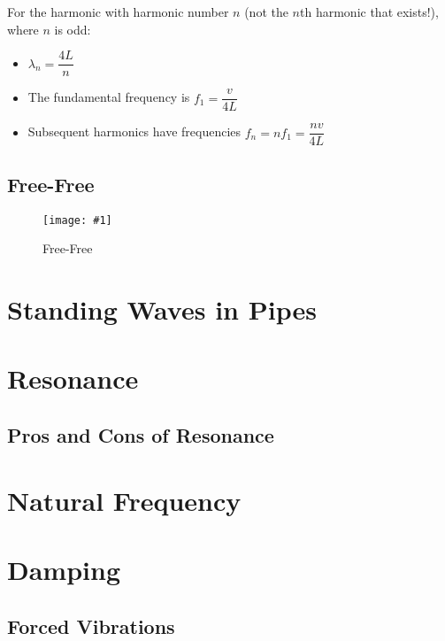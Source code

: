 \documentclass[a4paper,12pt]{article}
\let\oldsection\section
\renewcommand\section{\clearpage\oldsection}
\newcommand{\img}[4]{\begin{center}
  \begin{figure}[H]
    \centering
    \texttt{[image: \#1]}
    \caption{#3}
    \label{fig:#4}
  \end{figure}
\end{center}}
\begin{document}
For the harmonic with harmonic number $n$ (not the $n$th harmonic that exists!), where $n$ is odd:

\begin{itemize}
  \item $\lambda_n = \dfrac{4L}{n}$
  \item The fundamental frequency is $f_1 = \dfrac{v}{4L}$
  \item Subsequent harmonics have frequencies $f_n = nf_1 = \dfrac{nv}{4L}$
\end{itemize}

\pagebreak

\subsection{Free-Free}

\img{string3.png}{0.45}{Free-Free}{string3}

\section{Standing Waves in Pipes}

\section{Resonance}

\subsection{Pros and Cons of Resonance}

\section{Natural Frequency}

\section{Damping}

\subsection{Forced Vibrations}
\end{document}
